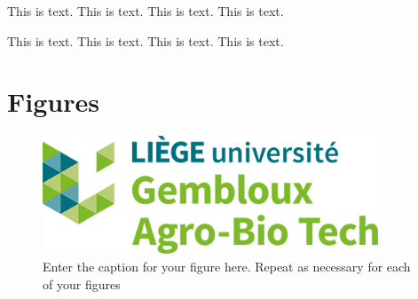 \documentclass[utf8]{ReportTERRA}
\begin{document}
This is  text.
This is  text.
This is text.
This is  text.

This is  text.
This is  text.
This is text.
This is  text.

\listofchanges

 



\section*{Figures}

\begin{figure}[h!]
\begin{center}
\includegraphics[width=10cm]{GABTlogo.png}
\end{center}
\caption{Enter the caption for your figure here.  Repeat as  necessary for each of your figures}\label{fig:1}
\end{figure}
\end{document}
